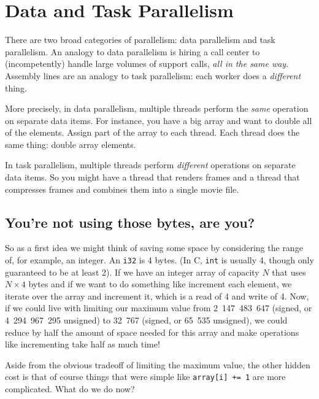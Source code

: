 





\section*{Data and Task Parallelism}
There are two broad categories of parallelism: data parallelism and
task parallelism. An analogy to data parallelism is hiring a call
center to (incompetently) handle large volumes of support calls,
\emph{all in the same way}. Assembly lines are an analogy to task
parallelism: each worker does a \emph{different} thing.

More precisely, in data parallelism, multiple threads perform the
\emph{same} operation on separate data items. For instance, you have a
big array and want to double all of the elements. Assign part of the
array to each thread. Each thread does the same thing: double array
elements.

In task parallelism, multiple threads perform \emph{different}
operations on separate data items. So you might have a thread that
renders frames and a thread that compresses frames and combines them
into a single movie file.


\subsection*{You're not using those bytes, are you?}
So as a first idea we might think of saving some space by considering the range of, for example, an integer. An \texttt{i32} is 4 bytes. (In C, \texttt{int} is usually 4, though only guaranteed to be at least 2). If we have an integer array of capacity $N$ that uses $N \times 4$ bytes and if we want to do something like increment each element, we iterate over the array and increment it, which is a read of 4 and write of 4. Now, if we could live with limiting our maximum value from 2~147~483~647 (signed, or 4~294~967~295 unsigned) to 32~767 (signed, or 65~535 unsigned), we could reduce by half the amount of space needed for this array and make operations like incrementing take half as much time!

Aside from the obvious tradeoff of limiting the maximum value, the other hidden cost is that of course things that were simple like \texttt{array[i] += 1} are more complicated. What do we do now?

